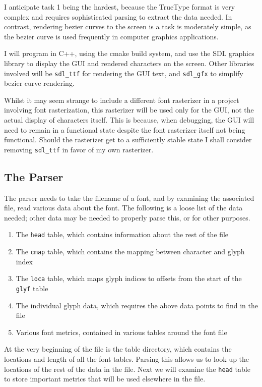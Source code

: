 \documentclass{report}
\begin{document}
I anticipate task 1 being the hardest, because the TrueType format is very
complex and requires sophisticated parsing to extract the data needed. In
contrast, rendering bezier curves to the screen is a task is moderately simple,
as the bezier curve is used frequently in computer graphics applications.

I will program in C++, using the cmake build system, and use the SDL graphics
library to display the GUI and rendered characters on the screen. Other
libraries involved will be \texttt{sdl\_ttf} for rendering the GUI text, and
 \texttt{sdl\_gfx} to simplify bezier curve rendering.

Whilst it may seem strange to include a different font rasterizer in a project
involving font rasterization, this rasterizer will be used only for the GUI, not
the actual display of characters itself. This is because, when debugging, the
GUI will need to remain in a functional state despite the font rasterizer itself
not being functional. Should the rasterizer get to a sufficiently stable state I
shall consider removing \texttt{sdl\_ttf} in favor of my own rasterizer.

\subsection{The Parser}
The parser needs to take the filename of a font, and by examining the associated
file, read various data about the font. The following is a loose list of the
data needed; other data may be needed to properly parse this, or for other
purposes.

\begin{enumerate}
  \item{The \texttt{head} table, which contains information about the rest of
      the file}
  \item{The \texttt{cmap} table, which contains the mapping between character
      and glyph index}
  \item{The \texttt{loca} table, which maps glyph indices to offsets from the
      start of the \texttt{glyf} table}
  \item{The individual glyph data, which requires the above data points to
      find in the file}
  \item{Various font metrics, contained in various tables around the font file}
\end{enumerate}

At the very beginning of the file is the table directory, which contains the
locations and length of all the font tables. Parsing this allows us to look up
the locations of the rest of the data in the file. Next we will examine the
\texttt{head} table to store important metrics that will be used elsewhere in
the file.
\end{document}
